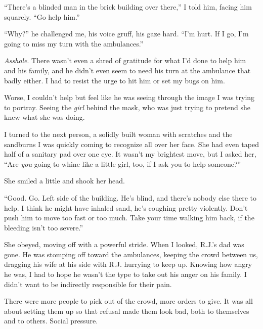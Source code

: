 ``There's a blinded man in the brick building over there,'' I told him, facing him squarely.  ``Go help him.''



``Why?'' he challenged me, his voice gruff, his gaze hard.  ``I'm hurt.  If I go, I'm going to miss my turn with the ambulances.''



\emph{Asshole}.  There wasn't even a shred of gratitude for what I'd done to help him and his family, and he didn't even seem to need his turn at the ambulance that badly either.  I had to resist the urge to hit him or set my bugs on him.



Worse, I couldn't help but feel like he was seeing through the image I was trying to portray.  Seeing the \emph{girl} behind the mask, who was just trying to pretend she knew what she was doing.



I turned to the next person, a solidly built woman with scratches and the sandburns I was quickly coming to recognize all over her face.  She had even taped half of a sanitary pad over one eye.  It wasn't my brightest move, but I asked her, ``Are \emph{you} going to whine like a little girl, too, if I ask you to help someone?''



She smiled a little and shook her head.



``Good.  Go.  Left side of the building.  He's blind, and there's nobody else there to help.  I think he might have inhaled sand, he's coughing pretty violently.  Don't push him to move too fast or too much.  Take your time walking him back, if the bleeding isn't too severe.''



She obeyed, moving off with a powerful stride.  When I looked, R.J.'s dad was gone.  He was stomping off toward the ambulances, keeping the crowd between us, dragging his wife at his side with R.J. hurrying to keep up.  Knowing how angry he was, I had to hope he wasn't the type to take out his anger on his family.  I didn't want to be indirectly responsible for their pain.



There were more people to pick out of the crowd, more orders to give.  It was all about setting them up so that refusal made them look bad, both to themselves and to others.  Social pressure.



